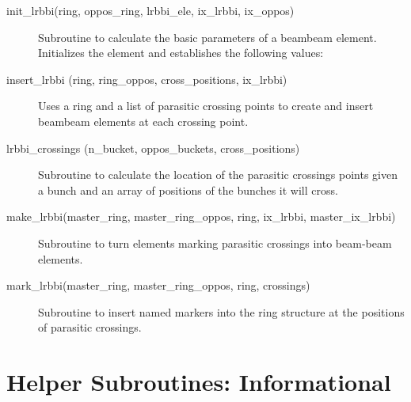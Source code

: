 \begin{description}

\item[init\_lrbbi(ring, oppos\_ring, lrbbi\_ele, ix\_lrbbi, ix\_oppos)] \Newline 
     Subroutine to calculate the basic parameters of a beambeam element. 
     Initializes the element and establishes the following values:

\item[insert\_lrbbi (ring, ring\_oppos, cross\_positions, ix\_lrbbi)] \Newline
Uses a ring and a list of parasitic crossing points to create and insert beambeam elements at each crossing point. 

\item[lrbbi\_crossings (n\_bucket, oppos\_buckets, cross\_positions)] \Newline
Subroutine to calculate the location of the parasitic crossings points given a bunch and an array of positions of the bunches it will cross. 

\item[make\_lrbbi(master\_ring, master\_ring\_oppos, ring, ix\_lrbbi, master\_ix\_lrbbi)] \Newline
Subroutine to turn elements marking parasitic crossings into beam-beam elements. 

\item[mark\_lrbbi(master\_ring, master\_ring\_oppos, ring, crossings)] \Newline
Subroutine to insert named markers into the ring structure at the positions of parasitic crossings. 

\end{description}

\section{Helper Subroutines: Informational}
\label{r:info}     

